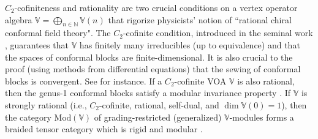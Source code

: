 \documentclass[11pt,b5paper,notitlepage]{article}
\theoremstyle{definition}
\theoremstyle{plain}
\newcommand{\Vbb}{\mathbb V}
\newcommand{\Nbb}{\mathbb N}
\newcommand{\<}{\left\langle}
\renewcommand{\>}{\right\rangle}
\newcommand{\Mod}{\mathrm{Mod}}
\numberwithin{equation}{section}
\begin{document}
$C_2$-cofiniteness and rationality are two crucial conditions on a vertex operator algebra $\Vbb=\bigoplus_{n\in\Nbb}\Vbb(n)$ that rigorize physicists' notion of ``rational chiral conformal field theory". The $C_2$-cofinite condition, introduced in the seminal work \cite{Zhu-modular-invariance}, guarantees that $\Vbb$ has finitely many irreducibles (up to equivalence) and that the spaces of conformal blocks are finite-dimensional. It is also crucial to the proof (using methods from differential equations) that the sewing of conformal blocks is convergent. See \cite{Zhu-modular-invariance,AN03-finite-dimensional,Miy-modular-invariance,Hua-differential-genus-0,Hua-differential-genus-1,NT-P1_conformal_blocks,Fio-genus-1,DGT2,Gui-sewingconvergence} for instance. If a $C_2$-cofinite VOA $\Vbb$ is also rational, then the genus-1 conformal blocks satisfy a modular invariance property \cite{Zhu-modular-invariance,DLM-modular-invariance,Hua-differential-genus-1}. If $\Vbb$ is strongly rational (i.e., $C_2$-cofinite, rational, self-dual, and $\dim\Vbb(0)=1$), then the category $\Mod(\Vbb)$ of grading-restricted (generalized) $\Vbb$-modules forms a braided tensor category \cite{HL-tensor-1,HL-tensor-2,HL-tensor-3,Hua-tensor-4,Hua-differential-genus-0,NT-P1_conformal_blocks} which is rigid and modular \cite{Hua-rigidity-modularity}. 
\end{document}
